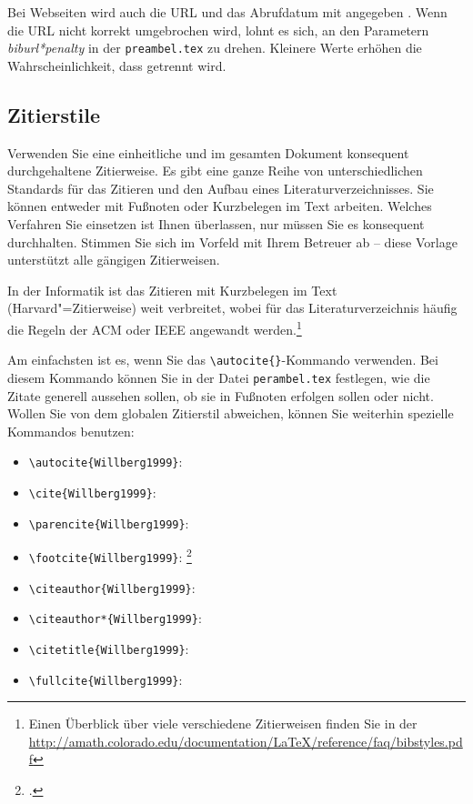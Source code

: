 Bei Webseiten wird auch die URL und das Abrufdatum mit angegeben \parencite{Gao2017}. Wenn die URL nicht korrekt umgebrochen wird, lohnt es sich, an den Parametern \textit{biburl*penalty} in der \texttt{preambel.tex} zu drehen. Kleinere Werte erhöhen die Wahrscheinlichkeit, dass getrennt wird.

\subsection{Zitierstile}

Verwenden Sie eine einheitliche und im gesamten Dokument konsequent durchgehaltene Zitierweise. Es gibt eine ganze Reihe von unterschiedlichen Standards für das Zitieren und den Aufbau eines Literaturverzeichnisses. Sie können entweder mit Fußnoten oder Kurzbelegen im Text arbeiten. Welches Verfahren Sie einsetzen ist Ihnen überlassen, nur müssen Sie es konsequent durchhalten. Stimmen Sie sich im Vorfeld mit Ihrem Betreuer ab -- diese Vorlage unterstützt alle gängigen Zitierweisen.

In der Informatik ist das Zitieren mit Kurzbelegen im Text (Harvard"=Zitierweise) weit verbreitet, wobei für das Literaturverzeichnis häufig die Regeln der \acs{ACM} oder \acs{IEEE} angewandt werden.\footnote{Einen Überblick über viele verschiedene Zitierweisen finden Sie in der \url{http://amath.colorado.edu/documentation/LaTeX/reference/faq/bibstyles.pdf}}

Am einfachsten ist es, wenn Sie das \verb+\autocite{}+-Kommando verwenden. Bei diesem Kommando können Sie in der Datei \texttt{perambel.tex} festlegen, wie die Zitate generell aussehen sollen, \zb{} ob sie in Fußnoten erfolgen sollen oder nicht. Wollen Sie von dem globalen Zitierstil abweichen, können Sie weiterhin spezielle Kommandos benutzen:

\begin{itemize}
	\item \verb+\autocite{Willberg1999}+: \autocite{Willberg1999}
	\item \verb+\cite{Willberg1999}+: \cite{Willberg1999}
	\item \verb+\parencite{Willberg1999}+: \parencite{Willberg1999}
	\item \verb+\footcite{Willberg1999}+: \footcite{Willberg1999}
	\item \verb+\citeauthor{Willberg1999}+: \citeauthor{Willberg1999}
	\item \verb+\citeauthor*{Willberg1999}+: \citeauthor*{Willberg1999}
	\item \verb++: \citetitle{Willberg1999}
	\item \verb++: \fullcite{Willberg1999}
\end{itemize}

